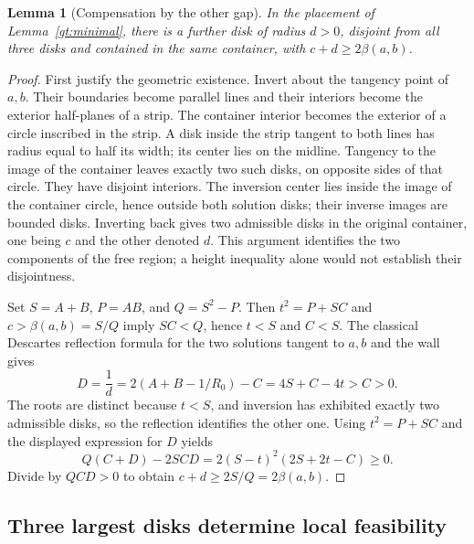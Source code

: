 \documentclass[11pt]{article}
\newtheorem{lemma}[theorem]{Lemma}
\theoremstyle{definition}
\begin{document}
\begin{lemma}[Compensation by the other gap]\label{gt:opposite}
In the placement of Lemma~\ref{gt:minimal}, there is a further disk
of radius $d>0$, disjoint from all three disks and contained in the
same container, with $c+d\ge2\beta(a,b)$.
\end{lemma}
\begin{proof}
First justify the geometric existence. Invert about the tangency point
of $a,b$. Their boundaries become parallel lines and their interiors
become the exterior half-planes of a strip. The container interior
becomes the exterior of a circle inscribed in the strip. A disk inside
the strip tangent to both lines has radius equal to half its width;
its center lies on the midline. Tangency to the image of the container
leaves exactly two such disks, on opposite sides of that circle. They
have disjoint interiors. The inversion center lies inside the image
of the container circle, hence outside both solution disks; their inverse
images are bounded disks. Inverting back gives two admissible disks in
the original container, one being $c$ and the other denoted $d$.
This argument identifies the two components of the free region; a
height inequality alone would not establish their disjointness.

Set $S=A+B$, $P=AB$, and $Q=S^2-P$. Then $t^2=P+SC$ and
$c>\beta(a,b)=S/Q$ imply $SC<Q$, hence $t<S$ and $C<S$.
The classical Descartes reflection formula for the two solutions
tangent to $a,b$ and the wall \cite[Section 3.3]{GrahamEtAl2005} gives
\[
 D=\frac1d=2(A+B-1/R_0)-C=4S+C-4t>C>0.
\]
The roots are distinct because $t<S$, and inversion has exhibited
exactly two admissible disks, so the reflection identifies the other one.
Using $t^2=P+SC$ and the displayed expression for $D$ yields
\[
 Q(C+D)-2SCD=2(S-t)^2(2S+2t-C)\ge0.
\]
Divide by $QCD>0$ to obtain $c+d\ge2S/Q=2\beta(a,b)$.
\end{proof}

\subsection{Three largest disks determine local feasibility}
\end{document}
